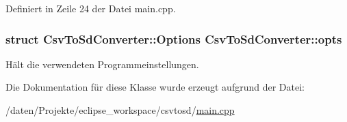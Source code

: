 Definiert in Zeile 24 der Datei main.\-cpp.

\hypertarget{classCsvToSdConverter_aed83889861a110c9913adb5b9f4d9eb3}{
\subsubsection[{opts}]{\setlength{\rightskip}{0pt plus 5cm}struct {\bf Csv\-To\-Sd\-Converter\-::\-Options}  Csv\-To\-Sd\-Converter\-::opts\hspace{0.3cm}{\ttfamily [protected]}}}\label{classCsvToSdConverter_aed83889861a110c9913adb5b9f4d9eb3}


Hält die verwendeten Programmeinstellungen. 



Die Dokumentation für diese Klasse wurde erzeugt aufgrund der Datei\-:\begin{DoxyCompactItemize}
\item 
/daten/\-Projekte/eclipse\-\_\-workspace/csvtosd/\hyperlink{csvtosd_2main_8cpp}{main.\-cpp}\end{DoxyCompactItemize}
